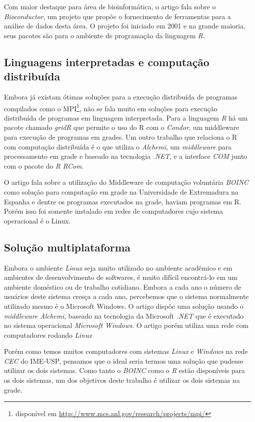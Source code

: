 Com maior destaque para área de bioinformática, o artigo 
\cite{bioconductor} fala sobre o \emph{Bioconductor}, um projeto  que propõe o fornecimento 
de ferramentas para a análise de dados desta área. O projeto foi iniciado em 2001 e na grande maioria, 
seus pacotes são para o ambiente de programação da linguagem \emph{R}.

\subsection{Linguagens interpretadas e computação distribuída}

Embora já existam ótimas soluções para a execução distribuída de programas compilados como o
 MPI\footnote{disponível em \url{http://www.mcs.anl.gov/research/projects/mpi/}}, não se fala muito em soluções 
para execução distribuída de programas em linguagem interpretada. 
Para a linguagem \emph{R} há um pacote chamado \emph{gridR} que permite o uso do R com o \emph{Condor}, %
um middleware para execução de programas em grades.  
Um outro trabalho que relaciona o R com computação distribuída é o \cite{Dias} que 
utiliza o \emph{Alchemi}, um \textit{middleware} para processamento em grade e baseado na 
tecnologia \textit{.NET}, e a interface \textit{COM} junto com o pacote do \emph{R}
\emph{RCom}.  


O artigo \cite{boinc} fala sobre a utilização do Middleware de computação voluntária \emph{BOINC} como solução para computação 
em grade na Universidade de Extremadura na Espanha e dentre os programas executados na grade, haviam
programas em R. Porém isso foi somente instalado em redes de computadores cujo sistema
operacional é o Linux. 


\subsection{Solução multiplataforma}

Embora o ambiente \emph{Linux} seja muito utilizado no ambiente acadêmico e em ambientes de desenvolvimento de softwares, é
muito difícil encontrá-lo em um ambiente doméstico ou de trabalho cotidiano. Embora a cada ano o número de usuários deste 
sistema cresça a cada ano, percebemos que o sistema normalmente utilizado mesmo é o Microsoft Windows. O artigo \cite{Dias}
dispõe uma solução usando o \emph{middleware} \emph{Alchemi}, baseado na tecnologia da Microsoft \emph{.NET} que é executado
no sistema operacional \emph{Microsoft Windows}. O artigo \cite{boinc} porém utiliza uma rede com computadores rodando \emph{Linux}

Porém como temos muitos computadores com sistemas \emph{Linux} e \emph{Windows} na rede \emph{CEC} do IME-USP,
pensamos que o ideal seria termos uma solução que pudesse utilizar os dois sistemas. Como tanto o \emph{BOINC} como o 
\emph{R} estão disponíveis para os dois sistemas, um dos objetivos deste trabalho é utilizar os dois sistemas na grade.


